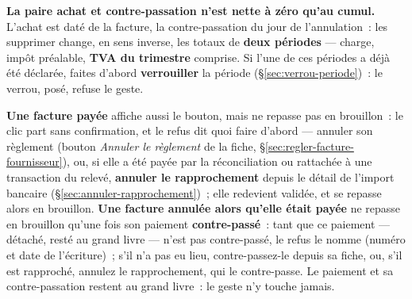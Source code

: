 \documentclass[a4paper,11pt,oneside]{article}
\begin{document}
\begin{keshwarning}
\textbf{La paire achat et contre-passation n'est nette à zéro qu'au cumul.} L'achat est daté de
la facture, la contre-passation du jour de l'annulation~: les supprimer change, en sens inverse,
les totaux de \textbf{deux périodes} --- charge, impôt préalable, \textbf{TVA du trimestre}
comprise. Si l'une de ces périodes a déjà été déclarée, faites d'abord \textbf{verrouiller} la
période (\S\ref{sec:verrou-periode})~: le verrou, posé, refuse le geste.
\end{keshwarning}

\textbf{Une facture payée} affiche aussi le bouton, mais ne repasse pas en brouillon~: le clic
part sans confirmation, et le refus dit quoi faire d'abord --- annuler son règlement (bouton
\emph{Annuler le règlement} de la fiche, \S\ref{sec:regler-facture-fournisseur}), ou, si elle a
été payée par la réconciliation ou rattachée à une transaction du relevé, \textbf{annuler le
rapprochement} depuis le détail de l'import bancaire (\S\ref{sec:annuler-rapprochement})~; elle
redevient validée, et se repasse alors en brouillon. \textbf{Une facture annulée alors qu'elle
était payée} ne repasse en brouillon qu'une fois son paiement \textbf{contre-passé}~: tant que ce
paiement --- détaché, resté au grand livre --- n'est pas contre-passé, le refus le nomme (numéro
et date de l'écriture)~; s'il n'a pas eu lieu, contre-passez-le depuis sa fiche, ou, s'il est
rapproché, annulez le rapprochement, qui le contre-passe. Le paiement et sa contre-passation
restent au grand livre~: le geste n'y touche jamais.
\end{document}
